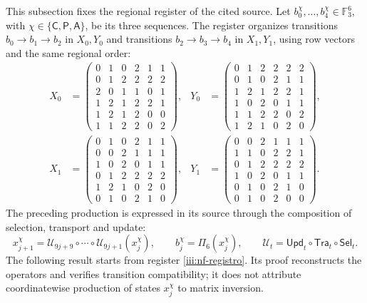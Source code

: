 This subsection fixes the regional register of the cited source.
Let $b_0^\chi,\ldots,b_4^\chi\in\mathbb F_3^6$, with
$\chi\in\{\mathsf C,\mathsf P,\mathsf A\}$, be its three sequences.
The register organizes transitions $b_0\to b_1\to b_2$ in
$X_0,Y_0$ and transitions $b_2\to b_3\to b_4$ in $X_1,Y_1$,
using row vectors and the same regional order:
\begingroup\small
\begin{equation}
\begin{aligned}
X_0&=\begin{pmatrix}
0&1&0&2&1&1\\0&1&2&2&2&2\\2&0&1&1&0&1\\
1&2&1&2&2&1\\1&2&1&2&0&0\\1&1&2&2&0&2
\end{pmatrix},&
Y_0&=\begin{pmatrix}
0&1&2&2&2&2\\0&1&0&2&1&1\\1&2&1&2&2&1\\
1&0&2&0&1&1\\1&1&2&2&0&2\\1&2&1&0&2&0
\end{pmatrix},\\[1ex]
X_1&=\begin{pmatrix}
0&1&0&2&1&1\\0&0&2&1&1&1\\1&0&2&0&1&1\\
0&1&2&2&2&2\\1&2&1&0&2&0\\0&1&0&2&1&0
\end{pmatrix},&
Y_1&=\begin{pmatrix}
0&0&2&1&1&1\\1&1&0&2&2&1\\0&1&2&2&2&2\\
1&0&2&0&1&1\\0&1&0&2&1&0\\0&1&0&2&0&0
\end{pmatrix}.
\end{aligned}
\label{iii:nf-registro}
\end{equation}
\endgroup
The preceding production is expressed in its source through
the composition of selection, transport and update:
\[
 x_{j+1}^{\chi}
 =\mathcal U_{9j+9}\circ\cdots\circ\mathcal U_{9j+1}(x_j^{\chi}),
 \qquad b_j^\chi=\Pi_6(x_j^\chi),
 \qquad\mathcal U_t=\mathsf{Upd}_t\circ\mathsf{Tra}_t\circ\mathsf{Sel}_t.
\]
The following result starts from register \eqref{iii:nf-registro}.
Its proof reconstructs the operators and verifies
transition compatibility; it does not attribute coordinatewise
production of states $x_j^\chi$ to matrix inversion.

